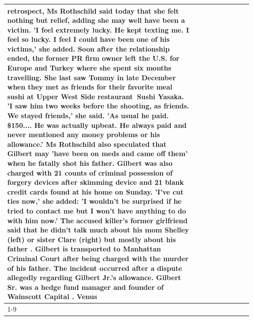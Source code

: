 \begin{table}[H]
\begin{tabular}{lllrlllll}
retrospect, Ms Rothschild said today that she felt nothing but relief, adding she may well have been a victim. 'I feel extremely lucky. He kept texting me. I feel so lucky. I feel I could have been one of his victims,' she added. Soon after the relationship ended, the former PR firm owner left the U.S. for Europe and Turkey where she spent six months  travelling. She last saw Tommy in late December when they met as friends for their favorite meal sushi at Upper West Side restaurant Sushi Yasaka. 'I saw him two weeks before the shooting, as friends. We stayed friends,' she said. 'As usual he paid. \$150.... He was actually upbeat. He always paid and never mentioned any money problems or his allowance.' Ms Rothschild also speculated that Gilbert may 'have been on meds and came off them' when he fatally shot his father. Gilbert was also charged with 21 counts of criminal possession of forgery devices after skimming device and 21 blank credit cards found at his home on Sunday. 'I've cut ties now,' she added: 'I wouldn’t be surprised if he tried to contact me but I won’t have anything to do with him now.' The accused killer's former girlfriend said that he didn't talk much about his mom Shelley (left) or sister Clare (right) but mostly about his father . Gilbert is transported to Manhattan Criminal Court  after being charged with the murder of his father. The incident occurred after a dispute allegedly regarding Gilbert Jr.'s allowance. Gilbert Sr. was a hedge fund manager and founder of Wainscott Capital . Venus \\
\cline{1-9}

\end{tabular}
\end{table}
